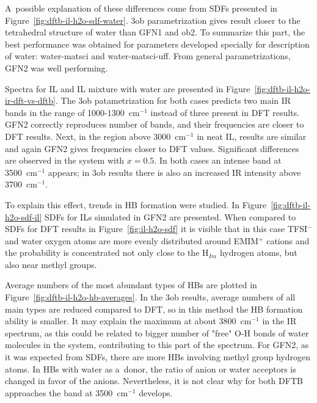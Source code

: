 A~possible explanation of these differences come from SDFs presented in Figure~\ref{fig:dftb-il-h2o-sdf-water}. 3ob parametrization gives result closer to the tetrahedral structure of water than GFN1 and ob2. To summarize this part, the best performance was obtained for parameters developed specially for description of water: water-matsci and water-matsci-uff. From general parametrizations, GFN2 was well performing.

Spectra for IL and IL mixture with water are presented in Figure~\ref{fig:dftb-il-h2o-ir-dft-vs-dftb}. The 3ob patametrization for both cases predicts two main IR bands in the range of 1000-1300~cm$^{-1}$ instead of three present in DFT results. GFN2 correctly reproduces number of bands, and their frequencies are closer to DFT results. Next, in the region above 3000~cm$^{-1}$ in neat IL, results are similar and again GFN2 gives frequencies closer to DFT values. Significant differences are observed in the system with $x = 0.5$. In both cases an intense band at 3500~cm$^{-1}$ appears; in 3ob results there is also an increased IR intensity above 3700~cm$^{-1}$.

To explain this effect, trends in HB formation were studied. In Figure~\ref{fig:dftb-il-h2o-sdf-il} SDFs for ILs simulated in GFN2 are presented. When compared to SDFs for DFT results in Figure~\ref{fig:il-h2o-sdf} it is visible that in this case TFSI$^{-}$ and water oxygen atoms are more evenly distributed around EMIM$^{+}$ cations and the probability is concentrated not only close to the H$_{Im}$ hydrogen atoms, but also near methyl groups.

Average numbers of the most abundant types of HBs are plotted in Figure~\ref{fig:dftb-il-h2o-hb-averages}. In the 3ob results, average numbers of all main types are reduced compared to DFT, so in this method the HB formation ability is smaller. It may explain the maximum at about 3800~cm$^{-1}$ in the IR spectrum, as this could be related to bigger number of "free" O-H bonds of water molecules in the system, contributing to this part of the spectrum. For GFN2, as it was expected from SDFs, there are more HBs involving methyl group hydrogen atoms. In HBs with water as a~donor, the ratio of anion or water acceptors is changed in favor of the anions. Nevertheless, it is not clear why for both DFTB approaches the band at 3500~cm$^{-1}$ develops.

